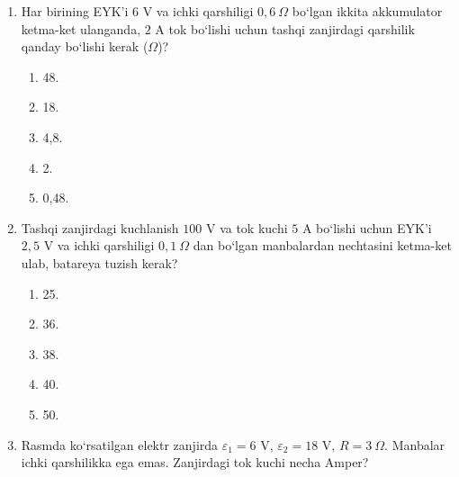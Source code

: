 \begin{enumerate}
\item Har birining EYK’i $6$ V va ichki qarshiligi $0,6~\Omega$ bo‘lgan ikkita akkumulator ketma-ket ulanganda, $2$ A tok bo‘lishi uchun tashqi zanjirdagi qarshilik qanday bo‘lishi kerak ($\Omega$)?
\begin{enumerate}[label=\Alph*)]
\item 48.
\item 18.
\item 4,8.
\item 2.
\item 0,48.
\end{enumerate}

\item Tashqi zanjirdagi kuchlanish $100$ V va tok kuchi $5$ A bo‘lishi uchun EYK’i $2,5$ V va ichki qarshiligi $0,1~\Omega$ dan bo‘lgan manbalardan nechtasini ketma-ket ulab, batareya tuzish kerak?
\begin{enumerate}[label=\Alph*)]
\item 25.
\item 36.
\item 38.
\item 40.
\item 50.
\end{enumerate}

\item Rasmda ko‘rsatilgan elektr zanjirda $\varepsilon_1=6$ V, $\varepsilon_2=18$ V, $R=3~\Omega$. Manbalar ichki qarshilikka ega emas. Zanjirdagi tok kuchi necha Amper?

\end{enumerate}
